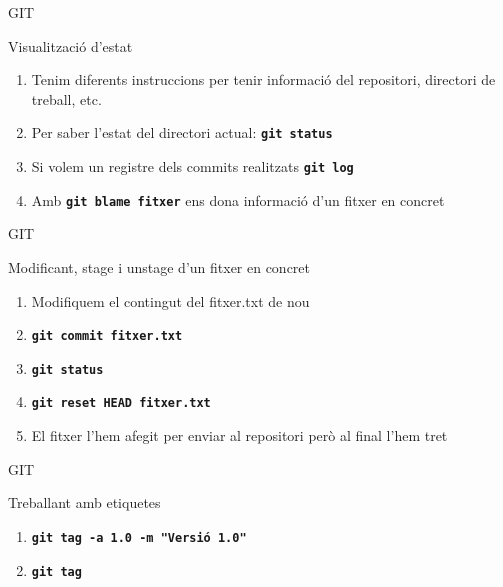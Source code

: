 \documentclass[10pt,xcolor={rgb}]{beamer}
\begin{document}
    \begin{frame}[fragile]{GIT}
      \begin{block}{Visualització d'estat}

        \begin{enumerate}
          \item Tenim diferents instruccions per tenir informació del repositori, directori de treball, etc.
          \item Per saber l'estat del directori actual: \texttt{\textbf{git status}} 
          \item Si volem un registre dels commits realitzats \texttt{\textbf{git log}}
          \item Amb \texttt{\textbf{git blame fitxer}} ens dona informació d'un fitxer en concret
        \end{enumerate}

      \end{block}
    \end{frame}

    \begin{frame}[fragile]{GIT}
      \begin{block}{Modificant, stage i unstage d'un fitxer en concret}

        \begin{enumerate}
          \item Modifiquem el contingut del fitxer.txt de nou
          \item \texttt{\textbf{git commit fitxer.txt}}
          \item \texttt{\textbf{git status}}
          \item \texttt{\textbf{git reset HEAD fitxer.txt}}
          \item El fitxer l'hem afegit per enviar al repositori però al final l'hem tret
        \end{enumerate}

      \end{block}
    \end{frame}

    \begin{frame}[fragile]{GIT}
      \begin{block}{Treballant amb etiquetes}

        \begin{enumerate}
          \item \texttt{\textbf{git tag -a 1.0 -m "Versió 1.0"}}
          \item \texttt{\textbf{git tag}}
        \end{enumerate}

        

      \end{block}
    \end{frame}
\end{document}

